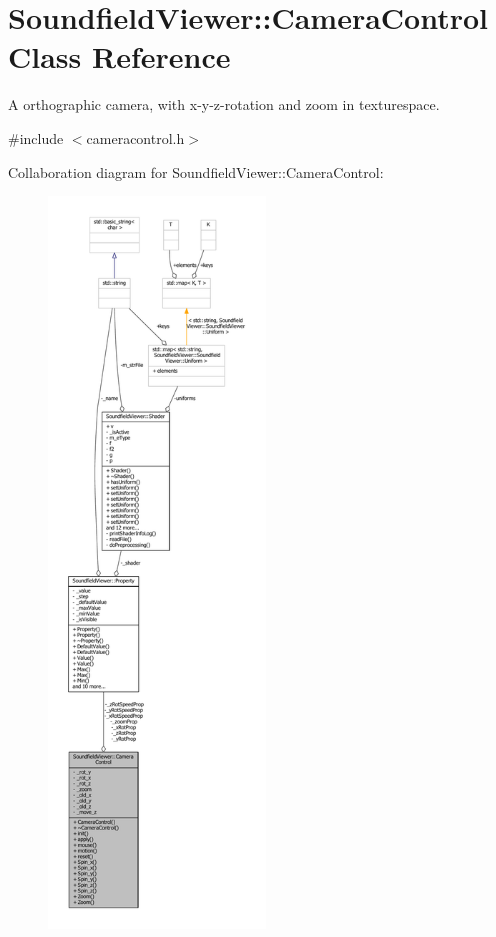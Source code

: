 \section{Soundfield\-Viewer\-:\-:Camera\-Control Class Reference}
\label{classSoundfieldViewer_1_1CameraControl}


A orthographic camera, with x-\/y-\/z-\/rotation and zoom in texturespace.  




{\ttfamily \#include $<$cameracontrol.\-h$>$}



Collaboration diagram for Soundfield\-Viewer\-:\-:Camera\-Control\-:
\nopagebreak
\begin{figure}[H]
\begin{center}
\leavevmode
\includegraphics[height=550pt]{d8/d56/classSoundfieldViewer_1_1CameraControl__coll__graph}
\end{center}
\end{figure}

